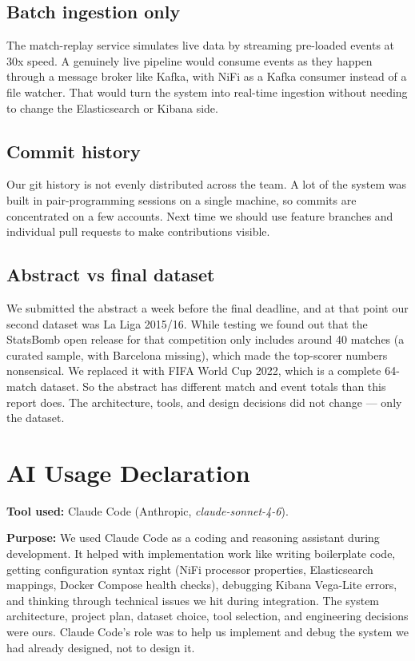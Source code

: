 \documentclass[conference]{IEEEtran}
\begin{document}
\subsection{Batch ingestion only}

The match-replay service simulates live data by streaming pre-loaded events
at 30x speed. A genuinely live pipeline would consume events as they happen
through a message broker like Kafka, with NiFi as a Kafka consumer instead of
a file watcher. That would turn the system into real-time ingestion without
needing to change the Elasticsearch or Kibana side.

\subsection{Commit history}

Our git history is not evenly distributed across the team. A lot of the
system was built in pair-programming sessions on a single machine, so
commits are concentrated on a few accounts. Next time we should use feature
branches and individual pull requests to make contributions visible.

\subsection{Abstract vs final dataset}

We submitted the abstract a week before the final deadline, and at that point
our second dataset was La Liga 2015/16. While testing we found out that the
StatsBomb open release for that competition only includes around 40 matches
(a curated sample, with Barcelona missing), which made the top-scorer numbers
nonsensical. We replaced it with FIFA World Cup 2022, which is a complete
64-match dataset. So the abstract has different match and event totals than
this report does. The architecture, tools, and design decisions did not
change — only the dataset.


\section{AI Usage Declaration}

\textbf{Tool used:} Claude Code (Anthropic, \textit{claude-sonnet-4-6}).

\textbf{Purpose:} We used Claude Code as a coding and reasoning assistant
during development. It helped with implementation work like writing
boilerplate code, getting configuration syntax right (NiFi processor
properties, Elasticsearch mappings, Docker Compose health checks), debugging
Kibana Vega-Lite errors, and thinking through technical issues we hit during
integration. The system architecture, project plan, dataset choice, tool
selection, and engineering decisions were ours. Claude Code's role was to
help us implement and debug the system we had already designed, not to design
it.
\end{document}
